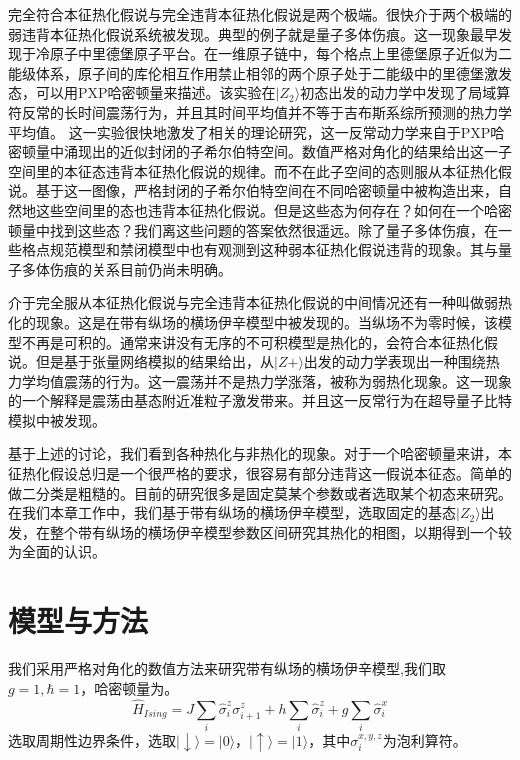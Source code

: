 完全符合本征热化假说与完全违背本征热化假说是两个极端。很快介于两个极端的弱违背本征热化假说系统被发现。典型的例子就是量子多体伤痕。这一现象最早发现于冷原子中里德堡原子平台\cite{bernien2017probing}。在一维原子链中，每个格点上里德堡原子近似为二能级体系，原子间的库伦相互作用禁止相邻的两个原子处于二能级中的里德堡激发态，可以用PXP哈密顿量来描述。该实验在$|Z_2\rangle$初态出发的动力学中发现了局域算符反常的长时间震荡行为，并且其时间平均值并不等于吉布斯系综所预测的热力学平均值。
这一实验很快地激发了相关的理论研究\cite{turner2018weak,Turner2018quantum,Ho2019periodic,Choi2019emergent,Michailidis2020slow,serbyn2021quantum,Yao2022quantum}，这一反常动力学来自于PXP哈密顿量中涌现出的近似封闭的子希尔伯特空间。数值严格对角化的结果给出这一子空间里的本征态违背本征热化假说的规律。而不在此子空间的态则服从本征热化假说。基于这一图像，严格封闭的子希尔伯特空间在不同哈密顿量中被构造出来\cite{Shiraishi2017Systematic,Moudgalya2018exact,Moudgalya2018entanglement,Khemani2020lacalization,Moudgalya2020eta,Lin2019Exact,Schecter2019weak,Mark2020unified,Mark2020eta,Pakrouski2020many,Ren2021quasi,ODea2020from}，自然地这些空间里的态也违背本征热化假说。但是这些态为何存在？如何在一个哈密顿量中找到这些态？我们离这些问题的答案依然很遥远。除了量子多体伤痕，在一些格点规范模型\cite{magnifico2020real,Chanda2020confinement,Borla2020confined}和禁闭模型\cite{Nandkishore2017many,kormos2017real,Robinson2019signature,Yang2020Hilbert,Castro2020entanglement}中也有观测到这种弱本征热化假说违背的现象。其与量子多体伤痕的关系目前仍尚未明确\cite{serbyn2021quantum}。


介于完全服从本征热化假说与完全违背本征热化假说的中间情况还有一种叫做弱热化的现象\cite{banuls2011strong}。这是在带有纵场的横场伊辛模型中被发现的。当纵场不为零时候，该模型不再是可积的。通常来讲没有无序的不可积模型是热化的，会符合本征热化假说。但是基于张量网络模拟的结果给出，从$|Z+\rangle$出发的动力学表现出一种围绕热力学均值震荡的行为。这一震荡并不是热力学涨落，被称为弱热化现象。这一现象的一个解释是震荡由基态附近准粒子激发带来\cite{Lin2017quasiparticle}。并且这一反常行为在超导量子比特模拟中被发现\cite{Chen2021observation}。

基于上述的讨论，我们看到各种热化与非热化的现象。对于一个哈密顿量来讲，本征热化假设总归是一个很严格的要求，很容易有部分违背这一假说本征态。简单的做二分类是粗糙的。目前的研究很多是固定莫某个参数或者选取某个初态来研究。在我们本章工作中，我们基于带有纵场的横场伊辛模型，选取固定的基态$|Z_2\rangle$出发，在整个带有纵场的横场伊辛模型参数区间研究其热化的相图，以期得到一个较为全面的认识。

\section{模型与方法}\label{4sec:method}
我们采用严格对角化的数值方法来研究带有纵场的横场伊辛模型,我们取$g=1,\hbar=1$，哈密顿量为。
\begin{equation}
\hat{H}_{Ising} = J\sum_{i}\hat{\sigma}^z_i\sigma^z_{i+1} + h\sum_{i}\hat{\sigma}^z_i + g\sum_i\hat{\sigma}^x_i
\label{Ising}
\end{equation}
选取周期性边界条件，选取$|\downarrow\rangle=|0\rangle$，$|\uparrow\rangle=|1\rangle$，其中$\sigma_i^{x,y,z}$为泡利算符。

